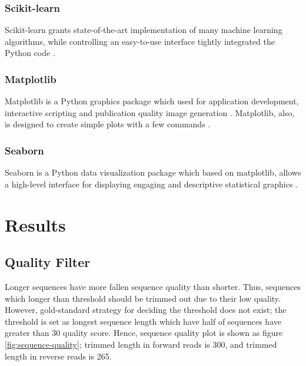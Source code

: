 \documentclass[a4paper]{article}
\begin{document}
            \subsubsection{Scikit-learn}
                Scikit-learn grants state-of-the-art implementation of many machine learning algorithms, while controlling an easy-to-use interface tightly integrated the Python code \cite{sklearn1}.

            \subsubsection{Matplotlib}
                Matplotlib is a Python graphics package which used for application development, interactive scripting and publication quality image generation \cite{matplotlib2}. Matplotlib, also, is designed to create simple plots with a few commands \cite{matplotlib1}.

            \subsubsection{Seaborn}
                Seaborn is a Python data visualization package which based on matplotlib, allows a high-level interface for displaying engaging and descriptive statistical graphics \cite{seaborn1}.

    \section{Results}
        \subsection{Quality Filter}
            Longer sequences have more fallen sequence quality than shorter. Thus, sequences which longer than threshold should be trimmed out due to their low quality. However, gold-standard strategy for deciding the threshold does not exist; the threshold is set as longest sequence length which have half of sequences have greater than 30 quality score. Hence, sequence quality plot is shown as figure \ref{fig:sequence-quality}; trimmed length in forward reads is 300, and trimmed length in reverse reads is 265.
\end{document}
